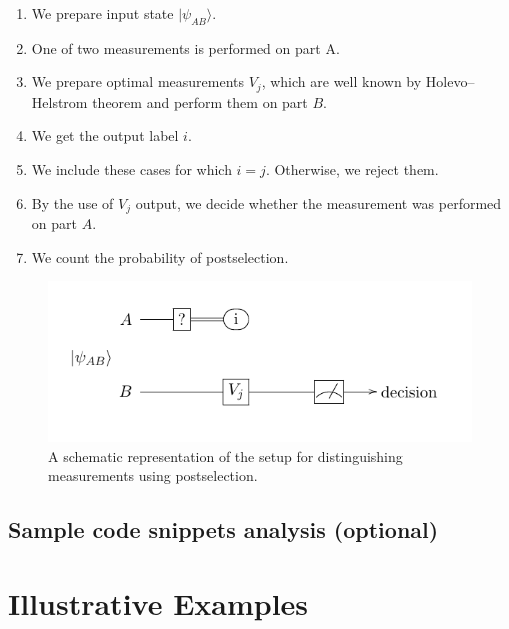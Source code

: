 \documentclass[preprint,12pt, a4paper]{elsarticle}
\newcommand{\ket}[1]{\ensuremath{|#1\rangle}}
\newcommand{\1}{{\rm 1\hspace{-0.9mm}l}}
\begin{document}
\begin{enumerate}
	\item We prepare input state $\ket{\psi_{AB}}$.
	\item One of two measurements is performed on part A.
	\item We prepare optimal measurements $V_j$, which are well known by Holevo--Helstrom theorem and perform them on part $B$.
	\item We get the output label $i$.
	\item We include these cases for which $i = j$. Otherwise, we reject them.
	\item By the use of $V_j$ output, we decide whether the measurement was performed on part $A$.
	\item We count the probability of postselection.
\end{enumerate}

\begin{figure}[h!]
	\includegraphics[scale=1.5]{onequbit.pdf}
	\caption{A schematic representation of the setup for distinguishing
		measurements using postselection.}
	\label{postselection}
\end{figure} 


\subsection{Sample code snippets analysis (optional)}
\label{}



\section{Illustrative Examples}
\end{document}

